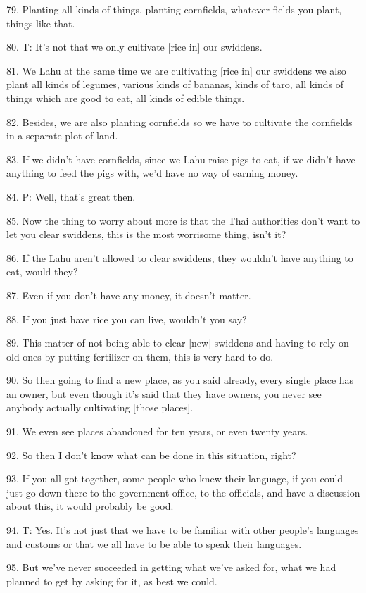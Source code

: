 79. Planting all kinds of things, planting cornfields, whatever fields you plant,
things like that.

80. T: It's not that we only cultivate [rice in] our swiddens.

81. We Lahu at the same time we are cultivating [rice in] our swiddens we also plant
all kinds of legumes, various kinds of bananas, kinds of taro, all kinds of things
which are good to eat, all kinds of edible things.

82. Besides, we are also planting cornfields so we have to cultivate the cornfields
in a separate plot of land.

83. If we didn't have cornfields, since we Lahu raise pigs to eat, if we didn't
have anything to feed the pigs with, we'd have no way of earning money.

84. P: Well, that's great then.

85. Now the thing to worry about more is that the Thai authorities don't want to
let you clear swiddens, this is the most worrisome thing, isn't it?

86. If the Lahu aren't allowed to clear swiddens, they wouldn't have anything to
eat, would they?

87. Even if you don't have any money, it doesn't matter.

88. If you just have rice you can live, wouldn't you say?

89. This matter of not being able to clear [new] swiddens and having to rely on
old ones by putting fertilizer on them, this is very hard to do.

90. So then going to find a new place, as you said already, every single place has
an owner, but even though it's said that they have owners, you never see anybody
actually cultivating [those places].

91. We even see places abandoned for ten years, or even twenty years.

92. So then I don't know what can be done in this situation, right?

93. If you all got together, some people who knew their language, if you could just
go down there to the government office, to the officials, and have a discussion
about this, it would probably be good.

94. T: Yes. It's not just that we have to be familiar with other people's languages
and customs or that we all have to be able to speak their languages.

95. But we've never succeeded in getting what we've asked for, what we had planned
to get by asking for it, as best we could.

